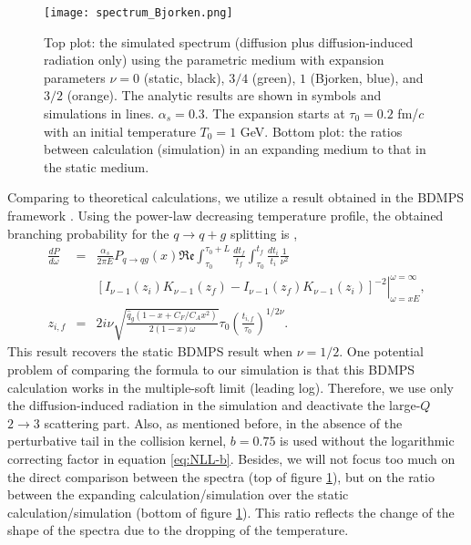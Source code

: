 \begin{figure}
\singlespacing
\centering
\texttt{[image: spectrum\_Bjorken.png]}
\caption[Top plot: the simulated spectrum (diffusion plus diffusion-induced]{Top plot: the simulated spectrum (diffusion plus diffusion-induced radiation only) using the parametric medium with expansion parameters $\nu = 0$ (static, black), $3/4$ (green), $1$ (Bjorken, blue), and $3/2$ (orange). The analytic results are shown in symbols and simulations in lines. $\alpha_s=0.3$. The expansion starts at $\tau_0 = 0.2$ fm/$c$ with an initial temperature $T_0 = 1$ GeV. Bottom plot: the ratios between calculation (simulation) in an expanding medium to that in the static medium.}
\label{fig:Bjorken-BDMPS}
\end{figure}

Comparing to theoretical calculations, we utilize a result obtained in the BDMPS framework \cite{Baier:1996kr,Baier:1998yf}.
Using the power-law decreasing temperature profile, the obtained branching probability for the $q\rightarrow q+g$ splitting is \cite{Baier:1998yf},
\begin{eqnarray}
\frac{dP}{d\omega} &=& \frac{\alpha_s}{2\pi E}P_{q\rightarrow qg}(x)\mathfrak{Re}\int_{\tau_0}^{\tau_0+L}\frac{dt_f}{t_f}\int_{\tau_0}^{t_f}\frac{dt_i}{t_i} \frac{1}{\nu^2}\\
\nonumber
&& \left.\left[ I_{\nu-1}(z_i)K_{\nu-1}(z_f)-I_{\nu-1}(z_f)K_{\nu-1}(z_i)\right]^{-2}\right|_{\omega=xE}^{\omega=\infty},\\
z_{i,f} &=& 2i\nu \sqrt{\frac{\hat{q}_g(1-x+C_F/C_A x^2)}{2(1-x)\omega}} \tau_0 \left( \frac{t_{i,f}}{\tau_0}\right) ^{1/2\nu}.
\end{eqnarray}
This result recovers the static BDMPS result \cite{Baier:1996kr} when $\nu=1/2$.
One potential problem of comparing the formula to our simulation is that this BDMPS calculation works in the multiple-soft limit (leading log).
Therefore, we use only the diffusion-induced radiation in the simulation and deactivate the large-$Q$ $2\rightarrow 3$ scattering part.
Also, as mentioned before, in the absence of the perturbative tail in the collision kernel, $b=0.75$ is used without the logarithmic correcting factor in equation \ref{eq:NLL-b}.
Besides, we will not focus too much on the direct comparison between the spectra (top of figure \ref{fig:Bjorken-BDMPS}), but on the ratio between the expanding calculation/simulation over the static calculation/simulation (bottom of figure \ref{fig:Bjorken-BDMPS}).
This ratio reflects the change of the shape of the spectra due to the dropping of the temperature.

